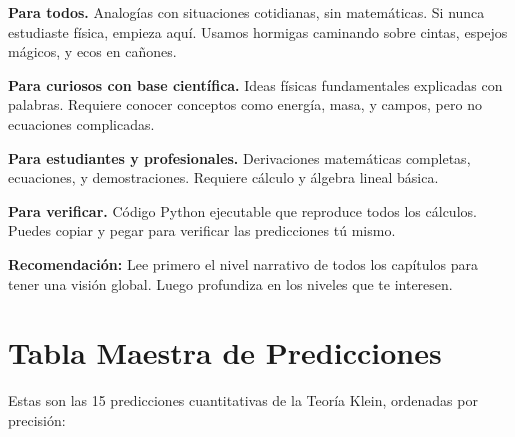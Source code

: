 \documentclass[12pt,a4paper,openany]{book}
\begin{document}
\begin{nivelnarrativo}
\textbf{Para todos.} Analogías con situaciones cotidianas, sin matemáticas. Si nunca estudiaste física, empieza aquí. Usamos hormigas caminando sobre cintas, espejos mágicos, y ecos en cañones.
\end{nivelnarrativo}

\begin{nivelconceptual}
\textbf{Para curiosos con base científica.} Ideas físicas fundamentales explicadas con palabras. Requiere conocer conceptos como energía, masa, y campos, pero no ecuaciones complicadas.
\end{nivelconceptual}

\begin{nivelmatematico}
\textbf{Para estudiantes y profesionales.} Derivaciones matemáticas completas, ecuaciones, y demostraciones. Requiere cálculo y álgebra lineal básica.
\end{nivelmatematico}

\begin{nivelcodigo}
\textbf{Para verificar.} Código Python ejecutable que reproduce todos los cálculos. Puedes copiar y pegar para verificar las predicciones tú mismo.
\end{nivelcodigo}

\textbf{Recomendación:} Lee primero el nivel narrativo de todos los capítulos para tener una visión global. Luego profundiza en los niveles que te interesen.

\newpage
\section*{Tabla Maestra de Predicciones}

Estas son las 15 predicciones cuantitativas de la Teoría Klein, ordenadas por precisión:
\end{document}
